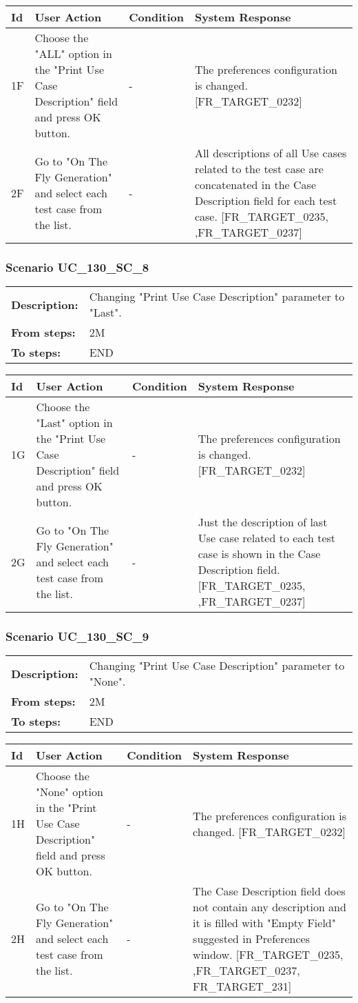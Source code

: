 \documentclass[a4paper,11pt]{article}
\newcommand{\bl}{\\ \hline}
\begin{document}
\begin{tabular}{|p{0.8in}|p{1.6in}|p{1.6in}|p{1.6in}|}
\hline
Id & User Action & Condition & System Response  \bl 
1F & Choose the "ALL" option in the "Print Use Case Description" field and press OK button. & - & The preferences configuration is changed. [FR_TARGET_0232] \bl 
2F & Go to "On The Fly Generation" and select each test case from the list. & - & All descriptions of all Use cases related to the test case are concatenated in the Case Description field for each test case. [FR_TARGET_0235, ,FR_TARGET_0237] \bl 
\end{tabular}
\subsubsection*{Scenario UC_130_SC_8}
\begin{tabular}{p{1in}p{4in}}
{\bf Description:} & Changing "Print Use Case Description" parameter to "Last". \\
{\bf From steps:} & 2M \\
{\bf To steps:} & END \\
\end{tabular}
 
\begin{tabular}{|p{0.8in}|p{1.6in}|p{1.6in}|p{1.6in}|}
\hline
Id & User Action & Condition & System Response  \bl 
1G & Choose the  "Last" option in the "Print Use Case Description" field and press OK button. & - & The preferences configuration is changed. [FR_TARGET_0232] \bl 
2G & Go to "On The Fly Generation" and select each test case from the list. & - & Just the description of last Use case related to each test case is shown in the Case Description field. [FR_TARGET_0235, ,FR_TARGET_0237] \bl 
\end{tabular}
\subsubsection*{Scenario UC_130_SC_9}
\begin{tabular}{p{1in}p{4in}}
{\bf Description:} & Changing "Print Use Case Description" parameter to "None". \\
{\bf From steps:} & 2M \\
{\bf To steps:} & END \\
\end{tabular}
 
\begin{tabular}{|p{0.8in}|p{1.6in}|p{1.6in}|p{1.6in}|}
\hline
Id & User Action & Condition & System Response  \bl 
1H & Choose the  "None" option in the "Print Use Case Description" field and press OK button. & - & The preferences configuration is changed. [FR_TARGET_0232] \bl 
2H & Go to "On The Fly Generation" and select each test case from the list. & - & The Case Description field does not contain any description and it is filled with "Empty Field" suggested in Preferences window. [FR_TARGET_0235, ,FR_TARGET_0237, FR_TARGET_231] \bl 
\end{tabular}
\end{document}
